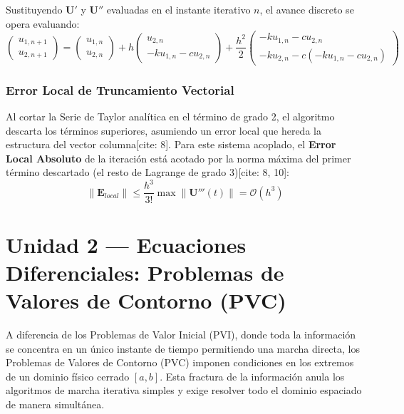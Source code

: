 \documentclass[12pt]{article}
\begin{document}
Sustituyendo $\mathbf{U}'$ y $\mathbf{U}''$ evaluadas en el instante iterativo $n$, el avance discreto se opera evaluando:
\begin{equation}
\begin{pmatrix}
    u_{1, n+1} \\ u_{2, n+1}
\end{pmatrix}
=
\begin{pmatrix}
    u_{1, n} \\ u_{2, n}
\end{pmatrix}
+ h 
\begin{pmatrix}
    u_{2, n} \\ -k u_{1, n} - c u_{2, n}
\end{pmatrix}
+ \frac{h^2}{2}
\begin{pmatrix}
    -k u_{1, n} - c u_{2, n} \\ -k u_{2, n} - c(-k u_{1, n} - c u_{2, n})
\end{pmatrix}
\end{equation}

\subsubsection*{Error Local de Truncamiento Vectorial}
Al cortar la Serie de Taylor analítica en el término de grado 2, el algoritmo descarta los términos superiores, asumiendo un error local que hereda la estructura del vector columna[cite: 8]. Para este sistema acoplado, el \textbf{Error Local Absoluto} de la iteración está acotado por la norma máxima del primer término descartado (el resto de Lagrange de grado 3)[cite: 8, 10]:
\begin{equation}
    \|\mathbf{E}_{local}\| \le \frac{h^3}{3!} \max \|\mathbf{U}'''(t)\| = \mathcal{O}(h^3)
\end{equation}

\section*{Unidad 2 — Ecuaciones Diferenciales: Problemas de Valores de Contorno (PVC)}

A diferencia de los Problemas de Valor Inicial (PVI), donde toda la información se concentra en un único instante de tiempo permitiendo una marcha directa, los Problemas de Valores de Contorno (PVC) imponen condiciones en los extremos de un dominio físico cerrado $[a, b]$. Esta fractura de la información anula los algoritmos de marcha iterativa simples y exige resolver todo el dominio espaciado de manera simultánea.
\end{document}
